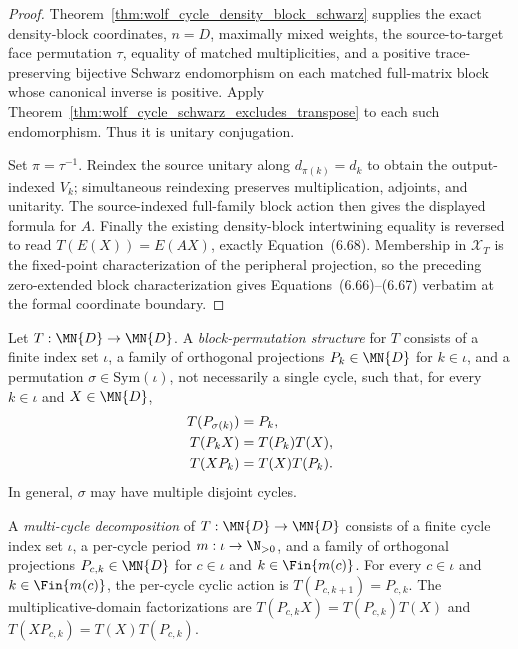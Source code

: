 \begin{proof}
    \leanok
    Theorem~\ref{thm:wolf_cycle_density_block_schwarz} supplies the exact
    density-block coordinates, $n=D$, maximally mixed weights, the
    source-to-target face permutation $\tau$, equality of matched
    multiplicities, and a positive trace-preserving bijective Schwarz
    endomorphism on each matched full-matrix block whose canonical inverse is
    positive. Apply
    Theorem~\ref{thm:wolf_cycle_schwarz_excludes_transpose} to each such
    endomorphism. Thus it is unitary conjugation.

    Set $\pi=\tau^{-1}$. Reindex the source unitary along
    $d_{\pi(k)}=d_k$ to obtain the output-indexed $V_k$; simultaneous
    reindexing preserves multiplication, adjoints, and unitarity. The
    source-indexed full-family block action then gives the displayed formula
    for $A$. Finally the existing density-block intertwining equality is
    reversed to read $T(E(X))=E(AX)$, exactly Equation~(6.68). Membership in
    $\mathcal X_T$ is the fixed-point characterization of the peripheral
    projection, so the preceding zero-extended block characterization gives
    Equations~(6.66)--(6.67) verbatim at the formal coordinate boundary.
\end{proof}

\begin{definition}
    \label{def:cycle_structure}
    \leanok
    Let $T:\MN{D}\to\MN{D}$. A \emph{block-permutation structure} for
    $T$ consists of a finite index set $\iota$, a family of orthogonal
    projections $P_k\in\MN{D}$ for $k\in\iota$, and a permutation
    $\sigma\in\mathrm{Sym}(\iota)$, not necessarily a single cycle, such
    that, for every $k\in\iota$ and $X\in\MN{D}$,
    \begin{align}
        T(P_{\sigma(k)}) & =P_k, \notag        \\
        T(P_kX)          & =T(P_k)T(X), \notag \\
        T(XP_k)          & =T(X)T(P_k).
        \notag
    \end{align}
    In general, $\sigma$ may have multiple disjoint cycles.
\end{definition}

\begin{definition}
    \label{def:multi_cycle_decomposition}
    \leanok
    A \emph{multi-cycle decomposition} of $T:\MN{D}\to\MN{D}$ consists of
    a finite cycle index set $\iota$, a per-cycle period
    $m:\iota\to\N_{>0}$, and a family of orthogonal projections
    $P_{c,k}\in\MN{D}$ for $c\in\iota$ and $k\in\Fin{m(c)}$. For every
    $c\in\iota$ and $k\in\Fin{m(c)}$, the per-cycle cyclic action is
    $T(P_{c,k+1})=P_{c,k}$. The multiplicative-domain factorizations are
    $T(P_{c,k}X)=T(P_{c,k})T(X)$ and
    $T(XP_{c,k})=T(X)T(P_{c,k})$.
\end{definition}

